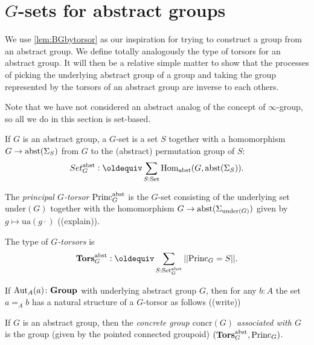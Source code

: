 \section{$G$-sets for abstract groups}
\label{sec:Gsetforabstract}


We use \cref{lem:BGbytorsor} as our inspiration for trying to construct a group from an abstract group.  We define totally analogously the type of torsors for an abstract group.  It will then be a relative simple matter to show that the processes of picking the underlying abstract group of a group and taking the group represented by the torsors of an abstract group are inverse to each others.

Note that we have not considered an abstract analog of the concept of $\infty$-group, so all we do in this section is set-based.

\begin{definition}
\label{def:abstrGtorsors}
  If $G$ is an abstract group, a $G$-set is a set $S$ together with a homomorphism
$G\to\mathrm{abst}(\Sigma_S)$
from $G$ to the (abstract) permutation group of $S$:
$$Set_G^\abstr\defequi \sum_{S:\Set}\Hom_\abstr(G,\abstr(\Sigma_S)).$$

The \emph{principal $G$-torsor} $\mathrm{Princ}_G^{\mathrm{abst}}$ is the $G$-set consisting of the underlying set $\mathrm{under}(G)$ together with the homomorphism $G\to\mathrm{abst}(\Sigma_{\mathrm{under}(G)})$ given by $g\mapsto \mathrm{ua}(g\cdot)$ ((explain)).

The type of \emph{$G$-torsors} is
$$\typetorsor_G^\abstr\defequi\sum_{S:\Set_G^\abstr}||\princ_G=S||.$$
\end{definition}
\begin{example}
  If $\mathrm{Aut}_A(a)\colon\mathbf{Group}$ with underlying abstract group $G$, then for any $b:A$ the set $a=_Ab$ has a natural structure of a $G$-torsor as follows ((write))
\end{example}

\newcommand{\concr}{\mathrm{concr}}
\begin{definition}
  If $G$ is an abstract group, then the \emph{concrete group $\concr(G)$ associated with $G$} is the group (given by the pointed connected groupoid) $(\mathbf{Tors}_G^{\mathrm{abst}},\mathrm{Princ}_G)$.
\end{definition}


